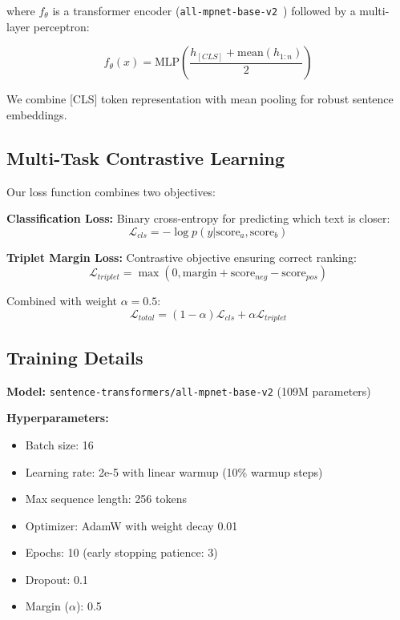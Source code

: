 \documentclass[conference]{IEEEtran}
\begin{document}
where $f_\theta$ is a transformer encoder (\texttt{all-mpnet-base-v2}~\cite{song2020mpnet}) followed by a multi-layer perceptron:

\begin{equation}
f_\theta(x) = \text{MLP}(\frac{h_{[CLS]} + \text{mean}(h_{1:n})}{2})
\end{equation}

We combine [CLS] token representation with mean pooling for robust sentence embeddings.

\subsection{Multi-Task Contrastive Learning}

Our loss function combines two objectives:

\textbf{Classification Loss:} Binary cross-entropy for predicting which text is closer:
\begin{equation}
\mathcal{L}_{cls} = -\log p(y | \text{score}_a, \text{score}_b)
\end{equation}

\textbf{Triplet Margin Loss:} Contrastive objective ensuring correct ranking:
\begin{equation}
\mathcal{L}_{triplet} = \max(0, \text{margin} + \text{score}_{neg} - \text{score}_{pos})
\end{equation}

Combined with weight $\alpha = 0.5$:
\begin{equation}
\mathcal{L}_{total} = (1-\alpha)\mathcal{L}_{cls} + \alpha\mathcal{L}_{triplet}
\end{equation}

\subsection{Training Details}

\textbf{Model:} \texttt{sentence-transformers/all-mpnet-base-v2} (109M parameters)

\textbf{Hyperparameters:}
\begin{itemize}
    \item Batch size: 16
    \item Learning rate: 2e-5 with linear warmup (10\% warmup steps)
    \item Max sequence length: 256 tokens
    \item Optimizer: AdamW with weight decay 0.01
    \item Epochs: 10 (early stopping patience: 3)
    \item Dropout: 0.1
    \item Margin ($\alpha$): 0.5
\end{itemize}
\end{document}
